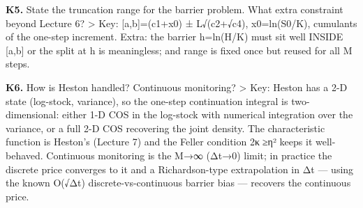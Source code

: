 \documentclass[
  11pt,
]{article}
\begin{document}
\textbf{K5.} State the truncation range for the barrier problem. What
extra constraint beyond Lecture 6? \textgreater{} Key: {[}a,b{]}=(c1+x0)
± L√(c2+√c4), x0=ln(S0/K), cumulants of the one-step increment. Extra:
the barrier h=ln(H/K) must sit well INSIDE {[}a,b{]} or the split at h
is meaningless; and range is fixed once but reused for all M steps.

\textbf{K6.} How is Heston handled? Continuous monitoring?
\textgreater{} Key: Heston has a 2-D state (log-stock, variance), so the
one-step continuation integral is two-dimensional: either 1-D COS in the
log-stock with numerical integration over the variance, or a full 2-D
COS recovering the joint density. The characteristic function is
Heston's (Lecture 7) and the Feller condition 2κ≥η² keeps it
well-behaved. Continuous monitoring is the M→∞ (Δt→0) limit; in practice
the discrete price converges to it and a Richardson-type extrapolation
in Δt --- using the known O(√Δt) discrete-vs-continuous barrier bias ---
recovers the continuous price.
\end{document}
